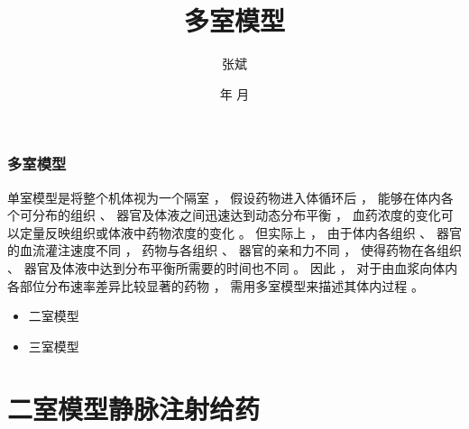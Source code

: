 \documentclass[dvipsnames, svgnames, x11names]{beamer}
\title{多室模型}
\author{张斌}
\institute[理工系]{河北农业大学 理工系}
\date{\the\year 年 \the\month 月}
\begin{document}
	
	\begin{frame}
		\titlepage
		\thispagestyle{empty}
		\addtocounter{framenumber}{-1}
	\end{frame}





\begin{frame}{}
	\begin{center}
		{\Huge \cbf{目 \ 录}}
	\end{center}
	\tableofcontents[subsectionstyle=hide/hide/show]
	\thispagestyle{empty}
	\addtocounter{framenumber}{-1}
\end{frame}

\begin{frame}
    \frametitle{多室模型}
    单室模型是将整个机体视为一个隔室 ， 假设药物进入体循环后 ， 能够在体内各个可分布的组织 、 器官及体液之间迅速达到动态分布平衡 ， 血药浓度的变化可以定量反映组织或体液中药物浓度的变化 。 但实际上 ， 由于体内各组织 、 器官的血流灌注速度不同 ， 药物与各组织 、 器官的亲和力不同 ， 使得药物在各组织 、 器官及体液中达到分布平衡所需要的时间也不同 。 因此 ， 对于由血浆向体内各部位分布速率差异比较显著的药物 ， 需用多室模型来描述其体内过程 。
    
    \begin{itemize}
      \item 二室模型
      \item 三室模型
    \end{itemize}
    
\end{frame}


\section{二室模型静脉注射给药}
\end{document}
